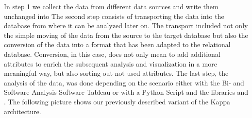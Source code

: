 In step 1 we collect the data from different data sources and write them unchanged into \gds{}
The second step consists of transporting the data into the \pg{} database from where it can be analyzed later on.
The transport included not only the simple moving of the data from the source to the target database but also the conversion of the data
into a format that has been adapted to the relational database.
Conversion, in this case, does not only mean to add additional attributes to enrich the subsequent analysis and visualization in a more meaningful way,
but also sorting out not used attributes.
The last step, the analysis of the data, was done depending on the scenario either with the Bi- and Software Analysis Software Tableau or with a Python Script and the libraries  and .
\newline
The following picture shows our previously described variant of the Kappa architecture.

